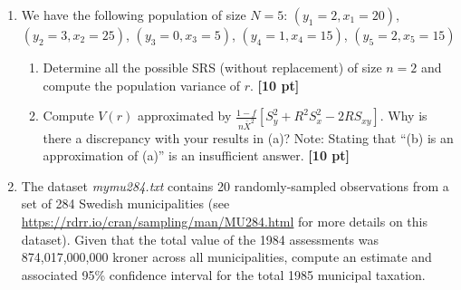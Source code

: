 \documentclass[12pt]{article}
\begin{document}
\begin{enumerate}
	\begin{enumerate}
		\item Estimate the percentage of students who routinely vape in this region, along with a 95\% confidence interval. You may assume equal clusters and sample sizes corresponding to the mean cluster size and sample size in the four schools. {\bf [10 pt]}
		\item The researcher now wants to study the prevalence of vaping among high school students in a different region with 35 high schools. She will sample $k$ schools and interview $m$ students at each school, and can afford to spend 300 hours on the project.  Assuming that it will take 20 hours to recruit a school into the sample and travel to the school and 30 minutes to interview each student (accounting for no shows and other administrative tasks), propose values of $k$ and $m$ for an optimal sample design using the results from (a). {\bf [15 pt]}
	\end{enumerate}

\item We have the following population of size $N=5$: $(y_1 = 2, x_1 = 20)$, $(y_2 = 3, x_2 = 25)$, $(y_3 = 0, x_3 = 5)$, $(y_4 = 1, x_4 = 15)$, $(y_5 = 2, x_5 = 15)$
	\begin{enumerate}
		\item Determine all the possible SRS (without replacement) of size $n=2$ and compute the population variance of $r$. {\bf [10 pt]}
		\item Compute $V(r)$ approximated by $\frac{1-f}{n \bar X^2} \left[ S_y^2 + R^2 S_x^2 - 2 R S_{xy} \right]$.  Why is there a discrepancy with your results in (a)? Note: Stating that ``(b) is an approximation of (a)'' is an insufficient answer. {\bf [10 pt]}
	\end{enumerate}
\item The dataset \emph{mymu284.txt} contains 20 randomly-sampled observations from a set of 284 Swedish municipalities (see \url{https://rdrr.io/cran/sampling/man/MU284.html} for more details on this dataset). Given that the total value of the 1984 assessments was 874,017,000,000 kroner across all municipalities, compute an estimate and associated 95\% confidence interval for the total 1985 municipal taxation.

\end{enumerate}
\end{document}
